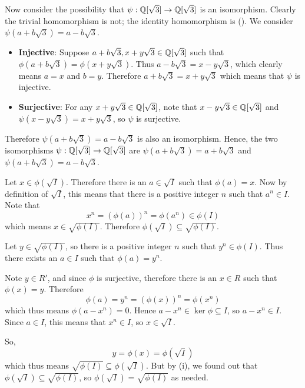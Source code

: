 \begin{questions}
    Now consider the possibility that $\psi: \mathbb{Q}[\sqrt3] \to \mathbb{Q}[\sqrt3]$ is an isomorphism. Clearly the trivial homomorphism is not; the identity homomorphism is (). We consider $\psi(a+b\sqrt3) = a-b\sqrt3$.
    \begin{itemize}
        \item \textbf{Injective}: Suppose $a+b\sqrt3, x+y\sqrt3 \in \mathbb{Q}[\sqrt3]$ such that $\phi(a+b\sqrt3) = \phi(x+y\sqrt3)$. Thus $a - b\sqrt3 = x - y\sqrt3$, which clearly means $a = x$ and $b = y$. Therefore $a+b\sqrt3 = x+y\sqrt3$ which means that $\psi$ is injective.
        \item \textbf{Surjective}: For any $x+y\sqrt3 \in \mathbb{Q}[\sqrt3]$, note that $x-y\sqrt3 \in \mathbb{Q}[\sqrt3]$ and $\psi(x-y\sqrt3) = x+y\sqrt3$, so $\psi$ is surjective.
    \end{itemize}
    Therefore $\psi(a+b\sqrt3) = a-b\sqrt3$ is also an isomorphism. Hence, the two isomorphisms $\psi: \mathbb{Q}[\sqrt3] \to \mathbb{Q}[\sqrt3]$ are $\psi(a+b\sqrt3) = a+b\sqrt3$ and $\psi(a+b\sqrt3) = a-b\sqrt3$.

    \item \begin{partquestions}{\roman*}
        \item Let $x \in \phi(\sqrt I)$. Therefore there is an $a \in \sqrt{I}$ such that $\phi(a) = x$. Now by definition of $\sqrt{I}$, this means that there is a positive integer $n$ such that $a^n \in I$. Note that
        \[
            x^n = \left(\phi(a)\right)^n = \phi(a^n) \in \phi(I)
        \]
        which means $x \in \sqrt{\phi(I)}$. Therefore $\phi(\sqrt I) \subseteq \sqrt{\phi(I)}$.

        \item Let $y \in \sqrt{\phi(I)}$, so there is a positive integer $n$ such that $y^n \in \phi(I)$. Thus there exists an $a \in I$ such that $\phi(a) = y^n$.
        
        Note $y \in R'$, and since $\phi$ is surjective, therefore there is an $x \in R$ such that $\phi(x) = y$. Therefore
        \[
            \phi(a) = y^n = \left(\phi(x)\right)^n = \phi\left(x^n\right)
        \]
        which thus means $\phi(a-x^n) = 0$. Hence $a-x^n \in \ker\phi \subseteq I$, so $a-x^n \in I$. Since $a \in I$, this means that $x^n \in I$, so $x \in \sqrt{I}$.

        So,
        \[
            y = \phi(x) = \phi(\sqrt I)
        \]
        which thus means $\sqrt{\phi(I)} \subseteq \phi(\sqrt I)$. But by (i), we found out that $\phi(\sqrt I) \subseteq \sqrt{\phi(I)}$, so $\phi(\sqrt I) = \sqrt{\phi(I)}$ as needed.
    \end{partquestions}


\end{questions}
